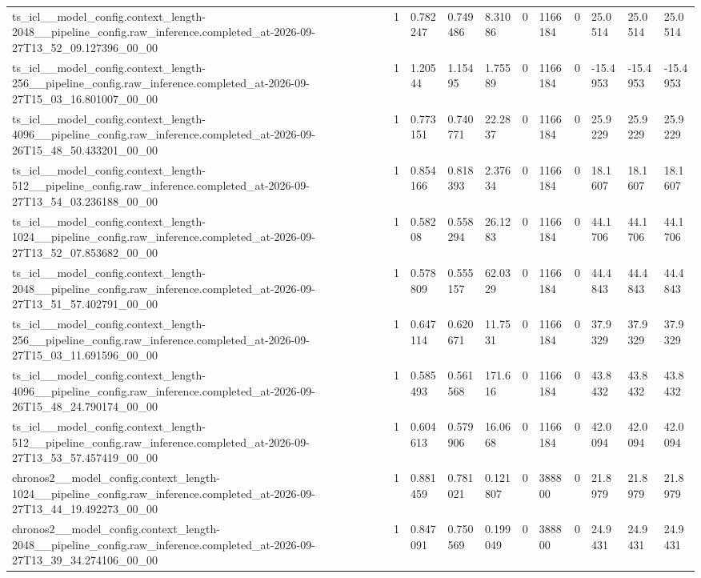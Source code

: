 \begin{tabular}{lllllllllll}
ts\_icl\_\_model\_config.context\_length-2048\_\_pipeline\_config.raw\_inference.completed\_at-2026-09-27T13\_52\_09.127396\_00\_00 & 1 & 0.782247 & 0.749486 & 8.31086 & 0 & 1166184 & 0 & 25.0514 & 25.0514 & 25.0514 \\
ts\_icl\_\_model\_config.context\_length-256\_\_pipeline\_config.raw\_inference.completed\_at-2026-09-27T15\_03\_16.801007\_00\_00 & 1 & 1.20544 & 1.15495 & 1.75589 & 0 & 1166184 & 0 & -15.4953 & -15.4953 & -15.4953 \\
ts\_icl\_\_model\_config.context\_length-4096\_\_pipeline\_config.raw\_inference.completed\_at-2026-09-26T15\_48\_50.433201\_00\_00 & 1 & 0.773151 & 0.740771 & 22.2837 & 0 & 1166184 & 0 & 25.9229 & 25.9229 & 25.9229 \\
ts\_icl\_\_model\_config.context\_length-512\_\_pipeline\_config.raw\_inference.completed\_at-2026-09-27T13\_54\_03.236188\_00\_00 & 1 & 0.854166 & 0.818393 & 2.37634 & 0 & 1166184 & 0 & 18.1607 & 18.1607 & 18.1607 \\
ts\_icl\_\_model\_config.context\_length-1024\_\_pipeline\_config.raw\_inference.completed\_at-2026-09-27T13\_52\_07.853682\_00\_00 & 1 & 0.58208 & 0.558294 & 26.1283 & 0 & 1166184 & 0 & 44.1706 & 44.1706 & 44.1706 \\
ts\_icl\_\_model\_config.context\_length-2048\_\_pipeline\_config.raw\_inference.completed\_at-2026-09-27T13\_51\_57.402791\_00\_00 & 1 & 0.578809 & 0.555157 & 62.0329 & 0 & 1166184 & 0 & 44.4843 & 44.4843 & 44.4843 \\
ts\_icl\_\_model\_config.context\_length-256\_\_pipeline\_config.raw\_inference.completed\_at-2026-09-27T15\_03\_11.691596\_00\_00 & 1 & 0.647114 & 0.620671 & 11.7531 & 0 & 1166184 & 0 & 37.9329 & 37.9329 & 37.9329 \\
ts\_icl\_\_model\_config.context\_length-4096\_\_pipeline\_config.raw\_inference.completed\_at-2026-09-26T15\_48\_24.790174\_00\_00 & 1 & 0.585493 & 0.561568 & 171.616 & 0 & 1166184 & 0 & 43.8432 & 43.8432 & 43.8432 \\
ts\_icl\_\_model\_config.context\_length-512\_\_pipeline\_config.raw\_inference.completed\_at-2026-09-27T13\_53\_57.457419\_00\_00 & 1 & 0.604613 & 0.579906 & 16.0668 & 0 & 1166184 & 0 & 42.0094 & 42.0094 & 42.0094 \\
chronos2\_\_model\_config.context\_length-1024\_\_pipeline\_config.raw\_inference.completed\_at-2026-09-27T13\_44\_19.492273\_00\_00 & 1 & 0.881459 & 0.781021 & 0.121807 & 0 & 388800 & 0 & 21.8979 & 21.8979 & 21.8979 \\
chronos2\_\_model\_config.context\_length-2048\_\_pipeline\_config.raw\_inference.completed\_at-2026-09-27T13\_39\_34.274106\_00\_00 & 1 & 0.847091 & 0.750569 & 0.199049 & 0 & 388800 & 0 & 24.9431 & 24.9431 & 24.9431 \\

\end{tabular}
